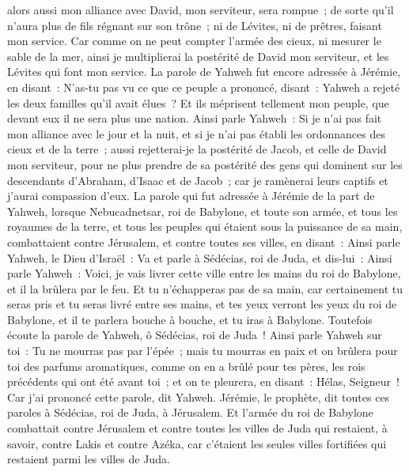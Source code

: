 \begin{multicols}{2}
alors aussi mon alliance avec David, mon serviteur, sera rompue~; de sorte qu'il n'aura plus de fils régnant sur son trône~; ni de Lévites, ni de prêtres, faisant mon service.
Car comme on ne peut compter l'armée des cieux, ni mesurer le sable de la mer, ainsi je multiplierai la postérité de David mon serviteur, et les Lévites qui font mon service.
La parole de Yahweh fut encore adressée à Jérémie, en disant~:
N'as-tu pas vu ce que ce peuple a prononcé, disant~: Yahweh a rejeté les deux familles qu'il avait élues~? Et ils méprisent tellement mon peuple, que devant eux il ne sera plus une nation. 
Ainsi parle Yahweh~: Si je n'ai pas fait mon alliance avec le jour et la nuit, et si je n'ai pas établi les ordonnances des cieux et de la terre~;
aussi rejetterai-je la postérité de Jacob, et celle de David mon serviteur, pour ne plus prendre de sa postérité des gens qui dominent sur les descendants d'Abraham, d'Isaac et de Jacob~; car je ramènerai leurs captifs et j'aurai compassion d'eux.
\VerseOne{}La parole qui fut adressée à Jérémie de la part de Yahweh, lorsque Nebucadnetsar, roi de Babylone, et toute son armée, et tous les royaumes de la terre, et tous les peuples qui étaient sous la puissance de sa main, combattaient contre Jérusalem, et contre toutes ses villes, en disant~:
Ainsi parle Yahweh, le Dieu d'Israël~: Va et parle à Sédécias, roi de Juda, et dis-lui~: Ainsi parle Yahweh~: Voici, je vais livrer cette ville entre les mains du roi de Babylone, et il la brûlera par le feu.
Et tu n'échapperas pas de sa main, car certainement tu seras pris et tu seras livré entre ses mains, et tes yeux verront les yeux du roi de Babylone, et il te parlera bouche à bouche, et tu iras à Babylone.
Toutefois écoute la parole de Yahweh, ô Sédécias, roi de Juda~! Ainsi parle Yahweh sur toi~: Tu ne mourras pas par l'épée~;
mais tu mourras en paix et on brûlera pour toi des parfums aromatiques, comme on en a brûlé pour tes pères, les rois précédents qui ont été avant toi~; et on te pleurera, en disant~: Hélas, Seigneur~! Car j'ai prononcé cette parole, dit Yahweh.
Jérémie, le prophète, dit toutes ces paroles à Sédécias, roi de Juda, à Jérusalem.
Et l'armée du roi de Babylone combattait contre Jérusalem et contre toutes les villes de Juda qui restaient, à savoir, contre Lakis et contre Azéka, car c'étaient les seules villes fortifiées qui restaient parmi les villes de Juda.

\end{multicols}
